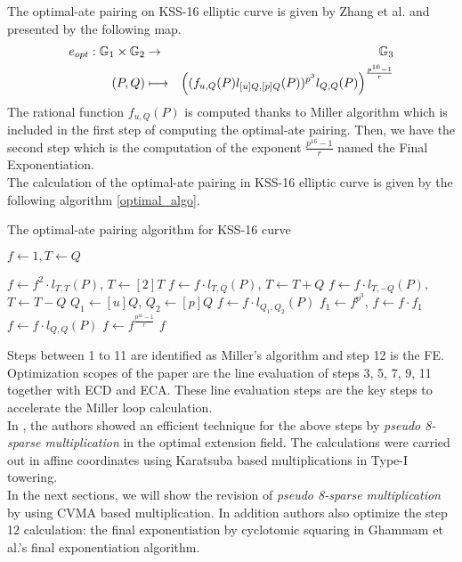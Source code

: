 The optimal-ate pairing on KSS-16 elliptic curve is given by Zhang et al. \cite{INDOCRYPT:ZhaLin12} and presented by the following map.
\begin{eqnarray*}
  e_{opt}: {\mathbb{G}}_{1}\times {\mathbb{G}}_{2} &\rightarrow & {\mathbb{G}}_{3} \\
  (P,Q) &\longmapsto &\left(( f_{u,Q}(P)l_{[u]Q,[p]Q}(P))^{p^3}l_{Q,Q}(P)\right)^{\frac{p^{16}-1}{r}}
\end{eqnarray*}
The rational function $f_{u,Q}(P)$ is computed thanks to Miller algorithm which is included in the first step of computing the optimal-ate pairing. Then, we have the second step which is the computation of the exponent $\frac{p^{16}-1}{r}$ named the Final Exponentiation.\\
The calculation of the optimal-ate pairing in KSS-16 elliptic curve is given by the following algorithm \ref{optimal_algo}.
\begin{algorithm}[!h]
	\caption{The optimal-ate pairing algorithm for KSS-16 curve}
	\label{optimal_algo}
	\DontPrintSemicolon
	\hspace{-3ex}
	\hspace{-3ex}
	\nl $f \leftarrow 1,T \leftarrow Q$
	
	\nl {} {
		\nl $f\leftarrow f^2\cdot l_{T,T}(P)$, $T\leftarrow [2]T$ 
		\nl {} {
			\nl $f\leftarrow f\cdot l_{T,Q}(P)$, $T\leftarrow T+Q$ }
		\nl {} {
			\nl $f\leftarrow f\cdot l_{T,-Q}(P)$, $T\leftarrow T-Q$} } 
	\nl $Q_1\leftarrow [u]Q$, $Q_2\leftarrow [p]Q$ \;
	\nl $f\leftarrow f\cdot l_{Q_1,Q_2}(P)$ \;
	\nl $f_1\leftarrow f^{p^3}$, $f\leftarrow f\cdot f_1$ \;
	\nl $f\leftarrow f\cdot l_{Q,Q}(P)$ \;
	\nl $f\leftarrow f^{\frac{p^{16}-1}{r}}$\;
	 $f$\;
\end{algorithm}

Steps between  1 to 11 are identified as Miller's algorithm and step 12 is the FE.
Optimization scopes of the paper are the line evaluation of steps 3, 5, 7, 9, 11 together with ECD and ECA.
These line evaluation steps are the key steps to accelerate the Miller loop calculation. \\
In \cite{INDOCRYPT:KNGDNK17}, the authors showed an efficient technique for the above steps by \textit{pseudo 8-sparse multiplication} in the optimal extension field. 
The calculations were carried out in affine coordinates using Karatsuba based multiplications in Type-I towering. \\
In the next sections, we will show the revision of \textit{pseudo 8-sparse multiplication} by using CVMA based multiplication.
In addition authors also optimize the step 12 calculation: the final exponentiation  by cyclotomic squaring \cite{PKC:GraSco10} in Ghammam et al.'s \cite{EPRINT:GhaFou16b} final exponentiation algorithm.

